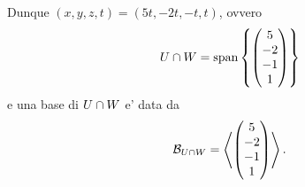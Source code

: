 \begin{example}
    Dunque $(x, y, z, t) = (5t, -2t, -t, t)$, ovvero \[
        U \cap W = \operatorname{span}\left\{\begin{pmatrix} 5\\-2\\-1\\1 \end{pmatrix}\right\}    
    \] e una base di $U \cap W$ e' data da \[
        \mathcal{B}_{U\cap W} = \left\langle \begin{pmatrix} 5\\-2\\-1\\1 \end{pmatrix} \right\rangle.
    \]
\end{example}
